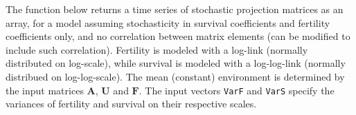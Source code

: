 \documentclass[
]{book}
\newenvironment{Shaded}{\begin{snugshade}}{\end{snugshade}}
\newcommand{\AttributeTok}[1]{\textcolor[rgb]{0.77,0.63,0.00}{#1}}
\newcommand{\CommentTok}[1]{\textcolor[rgb]{0.56,0.35,0.01}{\textit{#1}}}
\newcommand{\ControlFlowTok}[1]{\textcolor[rgb]{0.13,0.29,0.53}{\textbf{#1}}}
\newcommand{\DecValTok}[1]{\textcolor[rgb]{0.00,0.00,0.81}{#1}}
\newcommand{\FloatTok}[1]{\textcolor[rgb]{0.00,0.00,0.81}{#1}}
\newcommand{\FunctionTok}[1]{\textcolor[rgb]{0.00,0.00,0.00}{#1}}
\newcommand{\NormalTok}[1]{#1}
\newcommand{\OtherTok}[1]{\textcolor[rgb]{0.56,0.35,0.01}{#1}}
\newcommand{\SpecialCharTok}[1]{\textcolor[rgb]{0.00,0.00,0.00}{#1}}
\begin{document}
The function below returns a time series of stochastic projection matrices as an array, for a model assuming stochasticity in survival coefficients and fertility coefficients only, and no correlation between matrix elements (can be modified to include such correlation). Fertility is modeled with a log-link (normally distributed on log-scale), while survival is modeled with a log-log-link (normally distribued on log-log-scale). The mean (constant) environment is determined by the input matrices \(\mathbf{A}\), \(\mathbf{U}\) and \(\mathbf{F}\). The input vectors \texttt{VarF} and \texttt{VarS} specify the variances of fertility and survival on their respective scales.

\begin{Shaded}
\end{Shaded}
\end{document}
